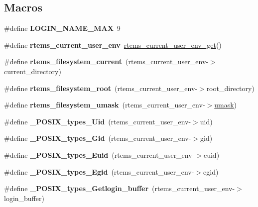 \subsection*{Macros}
\begin{DoxyCompactItemize}
\item 
\mbox{\label{group__LibIOEnv_gaf3b7f7833ae69cac7adf84f5973715fe}} 
\#define {\bfseries L\+O\+G\+I\+N\+\_\+\+N\+A\+M\+E\+\_\+\+M\+AX}~9
\item 
\mbox{\label{group__LibIOEnv_ga80974059633963836d87937ad5ca4c03}} 
\#define {\bfseries rtems\+\_\+current\+\_\+user\+\_\+env}~\mbox{\hyperlink{group__LibIOEnv_gae0ea3b12bb890c1f272b6d049a486160}{rtems\+\_\+current\+\_\+user\+\_\+env\+\_\+get}}()
\item 
\mbox{\label{group__LibIOEnv_gac8997d6970f349dfc2bb75994ff94dce}} 
\#define {\bfseries rtems\+\_\+filesystem\+\_\+current}~(rtems\+\_\+current\+\_\+user\+\_\+env-\/$>$current\+\_\+directory)
\item 
\mbox{\label{group__LibIOEnv_ga55916fd629c21ee981c970a6b524fdde}} 
\#define {\bfseries rtems\+\_\+filesystem\+\_\+root}~(rtems\+\_\+current\+\_\+user\+\_\+env-\/$>$root\+\_\+directory)
\item 
\mbox{\label{group__LibIOEnv_gaa8c61c8b38f039f9e01cc91da158ccab}} 
\#define {\bfseries rtems\+\_\+filesystem\+\_\+umask}~(rtems\+\_\+current\+\_\+user\+\_\+env-\/$>$\mbox{\hyperlink{umask_8c_a29eb55ccd23d386835c640026954ac93}{umask}})
\item 
\mbox{\label{group__LibIOEnv_ga7d19d804976ab7a6b8fbf7615f752960}} 
\#define {\bfseries \+\_\+\+P\+O\+S\+I\+X\+\_\+types\+\_\+\+Uid}~(rtems\+\_\+current\+\_\+user\+\_\+env-\/$>$uid)
\item 
\mbox{\label{group__LibIOEnv_ga3fb39fb00ec0d020acec7c8fb2a5d3c3}} 
\#define {\bfseries \+\_\+\+P\+O\+S\+I\+X\+\_\+types\+\_\+\+Gid}~(rtems\+\_\+current\+\_\+user\+\_\+env-\/$>$gid)
\item 
\mbox{\label{group__LibIOEnv_ga4df9de9abb57693ec7644bd62181a62b}} 
\#define {\bfseries \+\_\+\+P\+O\+S\+I\+X\+\_\+types\+\_\+\+Euid}~(rtems\+\_\+current\+\_\+user\+\_\+env-\/$>$euid)
\item 
\mbox{\label{group__LibIOEnv_ga7f64205904a3de49f010515dd02cee9a}} 
\#define {\bfseries \+\_\+\+P\+O\+S\+I\+X\+\_\+types\+\_\+\+Egid}~(rtems\+\_\+current\+\_\+user\+\_\+env-\/$>$egid)
\item 
\mbox{\label{group__LibIOEnv_ga20e68f243902ace9fb67097381034db4}} 
\#define {\bfseries \+\_\+\+P\+O\+S\+I\+X\+\_\+types\+\_\+\+Getlogin\+\_\+buffer}~(rtems\+\_\+current\+\_\+user\+\_\+env-\/$>$login\+\_\+buffer)
\end{DoxyCompactItemize}

